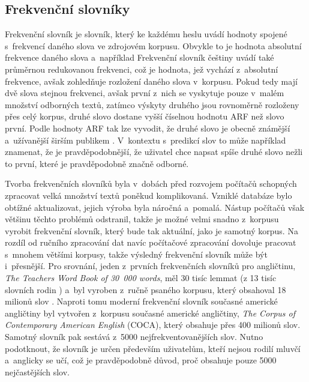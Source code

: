 \documentclass[a4paper,11pt,openany]{book} %
\begin{document}
\subsection{Frekvenční slovníky}\label{frecdic}

Frekvenční slovník je slovník, který ke každému heslu uvádí hodnoty spojené s~frekvencí daného slova ve zdrojovém korpusu. Obvykle to je hodnota absolutní frekvence daného slova a~například Frekvenční slovník češtiny %
uvádí také průměrnou redukovanou frekvenci, což je hodnota, jež vychází z~absolutní frekvence, avšak zohledňuje rozložení daného slova v~korpusu. Pokud tedy mají dvě slova stejnou frekvenci, avšak první z~nich se vyskytuje pouze v~malém množství odborných textů, zatímco výskyty druhého jsou rovnoměrně rozloženy přes celý korpus, druhé slovo dostane vyšší číselnou hodnotu ARF než slovo první. Podle hodnoty ARF tak lze vyvodit, že druhé slovo je obecně známější a~užívanější širším publikem \parencite{vcermak2004frekvenvcni}. %
V~kontextu s~predikcí slov to může například znamenat, že je pravděpodobnější, že uživatel chce napsat spíše druhé slovo nežli to první, které je pravděpodobně značně odborné.


Tvorba frekvenčních slovníků byla v~dobách před rozvojem počítačů schopných zpracovat velká množství textů poněkud komplikovaná. Vzniklé databáze bylo obtížné aktualizovat, jejich výroba byla náročná a~pomalá. Nástup počítačů však většinu těchto problémů odstranil, takže je možné velmi snadno z~korpusu vyrobit frekvenční slovník, který bude tak aktuální, jako je samotný korpus. Na rozdíl od ručního zpracování dat navíc počítačové zpracování dovoluje pracovat s~mnohem většími korpusy, takže výsledný frekvenční slovník může být i~přesnější. Pro srovnání, jeden z~prvních frekvenčních slovníků pro angličtinu, {\it The Teachers Word Book of 30~000 words}, měl 30 tisíc lemmat (z 13 tisíc slovních rodin \parencite{lorge1944teacher} %
) a~byl vyroben z~ručně psaného korpusu, který obsahoval 18 milionů slov \parencite{nation1997vocabulary}. %
Naproti tomu moderní frekvenční slovník současné americké angličtiny \parencite{davies2013frequency} byl vytvořen z~korpusu současné americké angličtiny, {\it The Corpus of Contemporary American English} (COCA), který obsahuje přes 400 milionů slov. Samotný slovník pak sestává z~5000 nejfrekventovanějších slov. Nutno podotknout, že slovník je určen především uživatelům, kteří nejsou rodilí mluvčí a~anglicky se učí, což je pravděpodobně důvod, proč obsahuje pouze 5000 nejčastějších slov.
\end{document}
